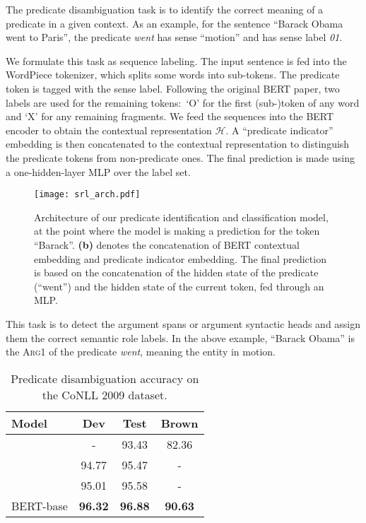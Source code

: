\documentclass[11pt,a4paper]{article}
\begin{document}
\smallskip {}
The predicate disambiguation task is to identify the correct meaning of a predicate in a given context. 
As an example, for the sentence ``Barack Obama went to Paris'', the predicate \textit{went} has sense ``motion'' and has sense label \textit{01}.

We formulate this task as sequence labeling.
The input sentence is fed into the WordPiece tokenizer, which splits some words into sub-tokens.
The predicate token is tagged with the sense label.
Following the original BERT paper, two labels are used for the remaining tokens:\ `O' for the first (sub-)token of any word and `X' for any remaining fragments. 
We feed the sequences into the BERT encoder to obtain the contextual representation $\mathcal{H}$. 
A ``predicate indicator'' embedding is then concatenated to the contextual representation to distinguish the predicate tokens from non-predicate ones. 
The final prediction is made using a one-hidden-layer MLP over the label set.

\begin{figure}[t]
	\centering
	\texttt{[image: srl\_arch.pdf]}
	\caption{Architecture of our predicate identification and classification model, at the point where the model is making a prediction for the token ``Barack''.
		\textbf{(b)} denotes the concatenation of BERT contextual embedding and predicate indicator embedding. The final prediction is based on the concatenation of the hidden state of the predicate (``went'') and the hidden state of the current token, fed through an MLP.}
	\label{fig:srl_arch}
\end{figure}

\smallskip {}
This task is to detect the argument spans or argument syntactic heads and assign them the correct semantic role labels. 
In the above example, ``Barack Obama'' is the \textsc{Arg1} of the predicate \textit{went}, meaning the entity in motion.

\begin{table}[t]
	\centering
	\small
	\begin{tabular}{l@{\qquad}ccc}
		\toprule
		\textbf{Model}         & \textbf{Dev} & \textbf{Test} & \textbf{Brown} \\ \midrule
		\citet{shi2017joint} &  - & 93.43 & 82.36 \\
		\citet{roth2016neural} & 94.77 & 95.47 & - \\
		\citet{he2018syntax} & 95.01 & 95.58 & - \\ \midrule
		BERT-base & \textbf{96.32 }& \textbf{96.88} &  \textbf{90.63}  \\ 
		\bottomrule
	\end{tabular}
	\caption{Predicate disambiguation accuracy on the CoNLL 2009 dataset.}
	\label{res:preddis}
\end{table}
\end{document}
